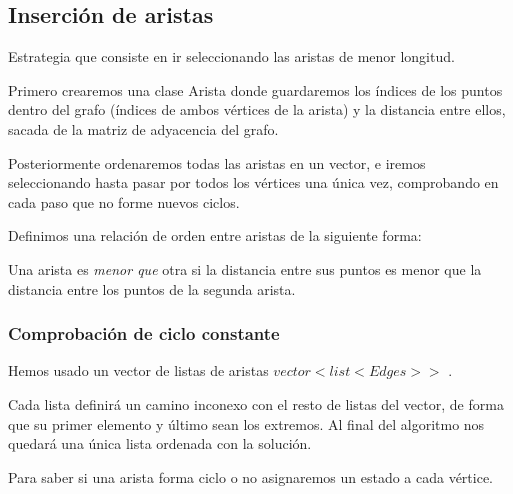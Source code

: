 \subsection{Inserción de aristas}

\begin{frame}
	\begin{block}{  }
	Estrategia que consiste en ir seleccionando las aristas de menor longitud.
	
	Primero crearemos una clase Arista donde guardaremos los índices de los puntos dentro 
	del grafo (índices de ambos vértices de la arista) y la distancia entre ellos, sacada 
	de la matriz de adyacencia del grafo.
	
	Posteriormente ordenaremos todas las aristas en un vector, e iremos seleccionando 
	hasta pasar por todos los vértices una única vez, comprobando en cada paso que no 
	forme nuevos ciclos.
	\end{block}
	
	\begin{block}
	Definimos una relación de orden entre aristas de la siguiente forma:

	Una arista es \textit{menor que} otra si la distancia entre sus puntos es menor que la 
	distancia entre los puntos de la segunda arista.
	\end{block}
\end{frame}

\subsubsection{Comprobación de ciclo constante}
\begin{frame}
	\begin{block}{ }
	Hemos usado un vector de listas de aristas $vector < list <Edges> >$ .

	Cada lista definirá un camino inconexo con el resto de listas del vector, de forma que 
	su primer elemento y último sean los extremos.
	Al final del algoritmo nos quedará una única lista ordenada con la solución.
	\end{block}
		
	\begin{alertblock}{ }
	Para saber si una arista forma ciclo o no asignaremos un estado a cada vértice.
	\end{alertblock}
	
\end{frame}

